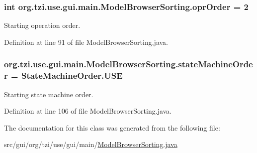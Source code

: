 \hypertarget{classorg_1_1tzi_1_1use_1_1gui_1_1main_1_1_model_browser_sorting_a720b167ed811a7277888f1f025d058a9}{
\subsubsection[{opr\-Order}]{\setlength{\rightskip}{0pt plus 5cm}int org.\-tzi.\-use.\-gui.\-main.\-Model\-Browser\-Sorting.\-opr\-Order = 2}}\label{classorg_1_1tzi_1_1use_1_1gui_1_1main_1_1_model_browser_sorting_a720b167ed811a7277888f1f025d058a9}
Starting operation order. 

Definition at line 91 of file Model\-Browser\-Sorting.\-java.

\hypertarget{classorg_1_1tzi_1_1use_1_1gui_1_1main_1_1_model_browser_sorting_a5cad94658211aca35a3d501afc26f7c2}{
\subsubsection[{state\-Machine\-Order}]{ org.\-tzi.\-use.\-gui.\-main.\-Model\-Browser\-Sorting.\-state\-Machine\-Order = {\bf State\-Machine\-Order.\-U\-S\-E}}}\label{classorg_1_1tzi_1_1use_1_1gui_1_1main_1_1_model_browser_sorting_a5cad94658211aca35a3d501afc26f7c2}
Starting state machine order. 

Definition at line 106 of file Model\-Browser\-Sorting.\-java.



The documentation for this class was generated from the following file\-:\begin{DoxyCompactItemize}
\item 
src/gui/org/tzi/use/gui/main/\hyperlink{_model_browser_sorting_8java}{Model\-Browser\-Sorting.\-java}\end{DoxyCompactItemize}
